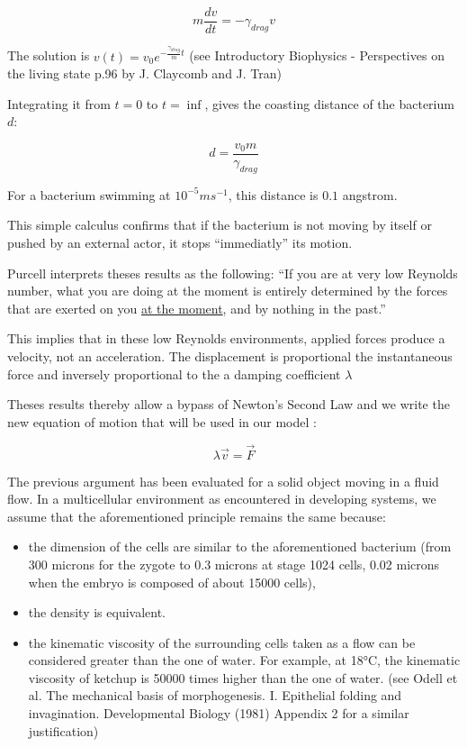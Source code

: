 $$m \frac{dv}{dt} = - \gamma_{drag} v$$

The solution is $v(t) = v_0 e^{ -\frac{\gamma_{drag}}{m} t}$ (see Introductory Biophysics - Perspectives on the living state p.96 by J. Claycomb and J. Tran)

Integrating it from $t=0$ to $t=\inf$, gives the coasting distance of the bacterium $d$:

$$d = \frac{v_0 m}{\gamma_{drag}}$$

For a bacterium swimming at $10^{-5} m s^{-1}$, this distance is $0.1$ angstrom.

This simple calculus confirms that if the bacterium is not moving by itself or pushed by an external actor, it stops “immediatly” its motion.

Purcell interprets theses results as the following: “If you are at very low Reynolds number, what you are doing at the moment is entirely determined by the forces that are exerted on you \underline{at the moment}, and by nothing in the past.”

This implies that in these low Reynolds environments, applied forces produce a velocity, not an acceleration. The displacement is proportional the instantaneous force and inversely proportional to the a damping coefficient $\lambda$

Theses results thereby allow a bypass of Newton's Second Law and we write the new equation of motion that will be used in our model :

$$\lambda \vec{v} = \vec{F}$$

The previous argument has been evaluated for a solid object moving in a fluid flow. In a multicellular environment as encountered in developing systems, we assume that the aforementioned principle remains the same because:
\begin{itemize}
	\item the dimension of the cells are similar to the aforementioned bacterium (from 300 microns for the zygote to 0.3 microns at stage 1024 cells, 0.02 microns when the embryo is composed of about 15000 cells), 
	\item the density is equivalent.
	\item the kinematic viscosity of the surrounding cells taken as a flow can be considered greater than the one of water. For example, at 18°C, the kinematic viscosity of ketchup is 50000 times higher than the one of water. (see Odell et al. The mechanical basis of morphogenesis. I. Epithelial folding and invagination. Developmental Biology (1981) Appendix 2 for a similar justification)
\end{itemize}

